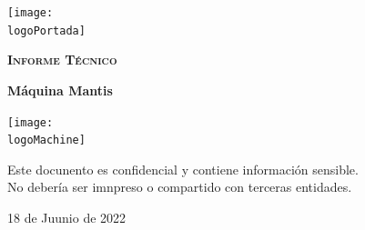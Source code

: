 \documentclass[a4paper]{article} %
\newcommand{\logoPortada}{logo_htb.png}
\newcommand{\machineName}{Mantis} %
\newcommand{\logoMachine}{mantis_logo.png} %
\newcommand{\startDate}{18 de Juunio de 2022} %
\begin{document}
    \cfoot{\thepage}
    \begin{titlepage}
    \centering
    \texttt{[image: \\logoPortada]}\par\vspace{1cm}
    {\scshape\LARGE \textbf{Informe Técnico}\par}
    \vspace{0.2cm}
    {\Huge\bfseries\textcolor{greeenPortada}{Máquina \machineName}\par}
    \vfill\vfill
    \texttt{[image: \\logoMachine]}\par\vspace{1cm}
    \vfill
    \begin{tcolorbox}[colback=red!5!white,colframe=red!75!black]
        \centering
        Este docunento es confidencial y contiene información sensible.
        \\No debería ser imnpreso o compartido con terceras entidades.
    \end{tcolorbox}
    \vfill
    {\large \startDate\par}
    \vfill
    \end{titlepage}
    \clearpage
    \tableofcontents
    \clearpage
\end{document}
